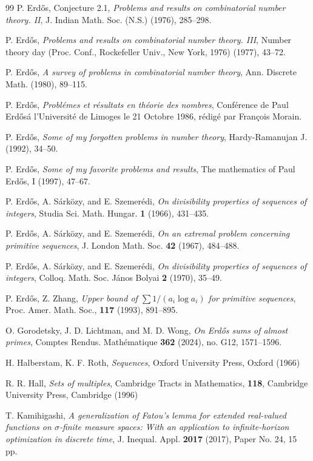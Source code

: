 \documentclass[12pt]{amsart}
\theoremstyle{definition}
\theoremstyle{remark}
\numberwithin{equation}{section}
\newcommand{\1}{{\mathbf 1}}
\newcommand{\Erdos}{{Erd\H{o}s}}
\begin{document}
\begin{thebibliography}{99}
P. \Erdos{}, Conjecture 2.1, 
\emph{Problems and results on combinatorial number theory. II},
J. Indian Math. Soc. (N.S.) (1976), 285--298.

P. \Erdos{},
\emph{Problems and results on combinatorial number theory. III}, Number theory day (Proc. Conf., Rockefeller Univ.,
New York, 1976) (1977), 43--72.

P. \Erdos{},
\emph{A survey of problems in combinatorial number theory},
Ann. Discrete Math. (1980), 89--115.

P. \Erdos{},
\emph{Probl\'emes et r\'esultats en th\'eorie des nombres},
Conf\'erence de Paul \Erdos \'a l'Universit\'e de Limoges le 21 Octobre 1986, r\'edig\'e par Fran\c{c}ois Morain.

P. \Erdos{},
\emph{Some of my forgotten problems in number theory}, Hardy-Ramanujan J. (1992), 34--50.

P. \Erdos{},
\emph{Some of my favorite problems and results}, The mathematics of Paul \Erdos{}, I (1997), 47--67.

P. \Erdos{}, A. S\'ark\"ozy, and E. Szemer\'edi,
\emph{On divisibility properties of sequences of integers}, Studia Sci. Math. Hungar. \textbf{1} (1966), 431--435.

P. \Erdos{}, A. S\'ark\"ozy, and E. Szemer\'edi,
\emph{On an extremal problem concerning primitive sequences},
J. London Math. Soc. \textbf{42} (1967), 484--488.

P. \Erdos{}, A. S\'ark\"ozy, and E. Szemer\'edi,
\emph{On divisibility properties of sequences of integers},
Colloq. Math. Soc. J\'anos Bolyai \textbf{2} (1970), 35--49.

 P. Erd\H os, Z. Zhang, \textit{Upper bound of $\sum 1/(a_i \log a_i)$ for primitive sequences}, Proc. Amer. Math. Soc., {\bf 117} (1993), 891--895.

O. Gorodetsky, J. D. Lichtman, and M. D. Wong,
\emph{On \Erdos{} sums of almost primes},
Comptes Rendus. Math\'ematique \textbf{362} (2024), no. G12, 1571--1596.

 H. Halberstam, K. F. Roth, {\it Sequences}, Oxford University Press, Oxford (1966)

 R. R. Hall, {\it Sets of multiples}, Cambridge Tracts in Mathematics, {\bf 118}, Cambridge University Press, Cambridge (1996)

T. Kamihigashi,
\emph{A generalization of Fatou's lemma for extended real-valued functions on $\sigma$-finite measure spaces: With an application to infinite-horizon optimization in discrete time},
J. Inequal. Appl. \textbf{2017} (2017), Paper No. 24, 15 pp.


\end{thebibliography}
\end{document}
